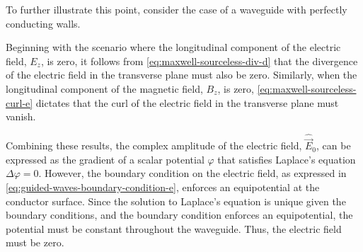 \documentclass[14pt,a4paper]{ntust_report}
\begin{document}
\begin{remark}
    \label{remark:nonexistence-of-tem-waves-in-hollow-waveguides}
    To further illustrate this point, consider the case of a waveguide with perfectly conducting walls.
    
    Beginning with the scenario where the longitudinal component of the electric field, $E_z$, is zero, it follows from \cref{eq:maxwell-sourceless-div-d} that the divergence of the electric field in the transverse plane must also be zero. Similarly, when the longitudinal component of the magnetic field, $B_z$, is zero, \cref{eq:maxwell-sourceless-curl-e} dictates that the curl of the electric field in the transverse plane must vanish.
    
    Combining these results, the complex amplitude of the electric field, $\hat{\vec E}_0$, can be expressed as the gradient of a scalar potential $\varphi$ that satisfies Laplace's equation $\Delta\varphi = 0$. However, the boundary condition on the electric field, as expressed in \cref{eq:guided-waves-boundary-condition-e}, enforces an equipotential at the conductor surface. Since the solution to Laplace's equation is unique given the boundary conditions, and the boundary condition enforces an equipotential, the potential must be constant throughout the waveguide. Thus, the electric field must be zero.
\end{remark}
\end{document}
